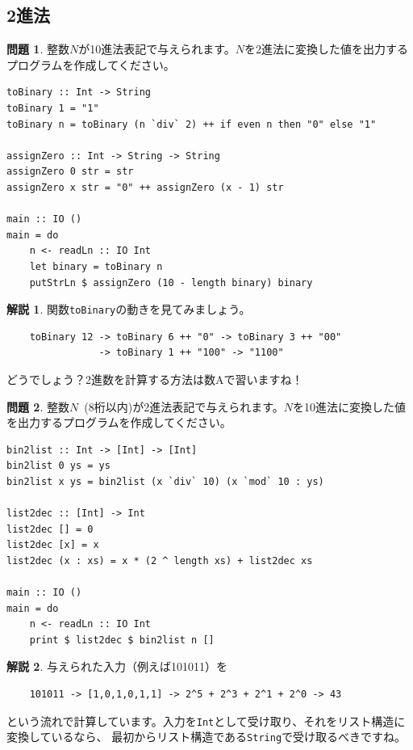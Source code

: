 \documentclass[12pt,a4paper,dvipdfmx,fleqn]{article}%
\theoremstyle{definition}
\newtheorem*{toi*}{問題}
\theoremstyle{definition}
\newtheorem*{ans*}{解説}
\theoremstyle{definition}
\begin{document}
\subsection{2進法}\label{2進法}
\begin{toi*}
    整数$N$が10進法表記で与えられます。$N$を2進法に変換した値を出力するプログラムを作成してください。
\end{toi*}
\begin{lstlisting}[caption=A04.hs,label=A04]
toBinary :: Int -> String
toBinary 1 = "1"
toBinary n = toBinary (n `div` 2) ++ if even n then "0" else "1"

assignZero :: Int -> String -> String
assignZero 0 str = str
assignZero x str = "0" ++ assignZero (x - 1) str

main :: IO ()
main = do
    n <- readLn :: IO Int
    let binary = toBinary n
    putStrLn $ assignZero (10 - length binary) binary
\end{lstlisting}
\begin{ans*}
    関数\texttt{toBinary}の動きを見てみましょう。
    \begin{verbatim}
    toBinary 12 -> toBinary 6 ++ "0" -> toBinary 3 ++ "00"
                -> toBinary 1 ++ "100" -> "1100"
    \end{verbatim}
    \vspace*{-4mm}
    どうでしょう？2進数を計算する方法は数Aで習いますね！
\end{ans*}
\begin{toi*}
    整数$N$~(8桁以内)が2進法表記で与えられます。$N$を10進法に変換した値を出力するプログラムを作成してください。
\end{toi*}
\begin{lstlisting}[caption=B04.hs,label=B04]
bin2list :: Int -> [Int] -> [Int]
bin2list 0 ys = ys
bin2list x ys = bin2list (x `div` 10) (x `mod` 10 : ys)

list2dec :: [Int] -> Int
list2dec [] = 0
list2dec [x] = x
list2dec (x : xs) = x * (2 ^ length xs) + list2dec xs

main :: IO ()
main = do
    n <- readLn :: IO Int
    print $ list2dec $ bin2list n []
\end{lstlisting}
\begin{ans*}
    与えられた入力（例えば101011）を
    \begin{verbatim}
    101011 -> [1,0,1,0,1,1] -> 2^5 + 2^3 + 2^1 + 2^0 -> 43
    \end{verbatim}
    \vspace*{-4mm}
    という流れで計算しています。入力を\texttt{Int}として受け取り、それをリスト構造に変換しているなら、
    最初からリスト構造である\texttt{String}で受け取るべきですね。
\end{ans*}
\end{document}
